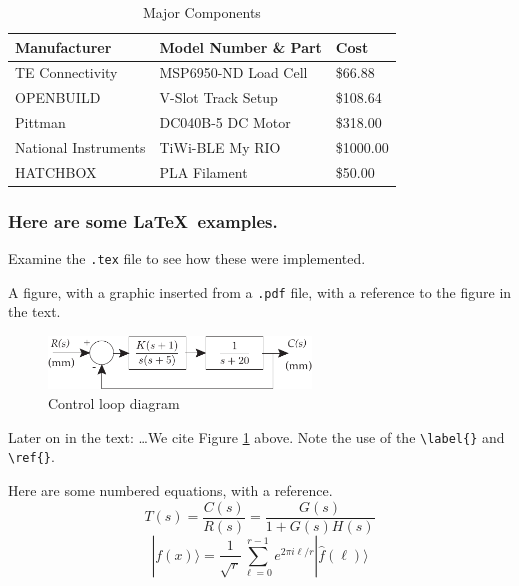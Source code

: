 \documentclass[twocolumn]{article}
\newcommand{\ket}[1]{|#1\rangle}
\begin{document}
\begin{table}[H]
	\centering
	\caption{Major Components}
	\label{major_components}
	\begin{tabular}{|l|l|l|}
		\hline
		Manufacturer                            & Model Number \& Part    & Cost      \\ \hline	\hline
		TE Connectivity & MSP6950-ND Load Cell    & \$66.88   \\ \hline
		OPENBUILD                      & V-Slot Track Setup      & \$108.64  \\ \hline
		Pittman                                 & DC040B-5 DC Motor & \$318.00  \\ \hline
		National Instruments                    & TiWi-BLE My RIO         & \$1000.00 \\ \hline
		HATCHBOX                                & PLA Filament            & \$50.00   \\ \hline
\end{tabular}
\end{table}

\newpage
\subsubsection*{Here are some \LaTeX\ examples.} 

Examine the \verb|.tex| file to see how these were implemented.

\vspace{.167in}
A figure, with a graphic inserted from a \verb|.pdf| file, with a reference to the figure in the text.
\begin{figure}[htbp]
\begin{center}
\includegraphics[width=2.75in]{ControlLoop2.pdf}
\caption{Control loop diagram}
\label{ControlLoop}
\end{center}
\end{figure}

Later on in the text: \dots We cite Figure \ref{ControlLoop} above.  Note the use of the \verb|\label{}| and \verb|\ref{}|.

Here are some numbered equations, with a reference.
\begin{equation}
T(s)=\frac{C(s)}{R(s)}=\frac{G(s)}{1+G(s)H(s)}
\label{eTF}
\end{equation}
\begin{equation}
\ket{f(x)} = \frac{1}{\sqrt{r}}\sum_{\ell=0}^{r-1}e^{2\pi i \ell/r}\ket{\hat{f}(\ell)}
\label{eFT}
\end{equation}
\end{document}
